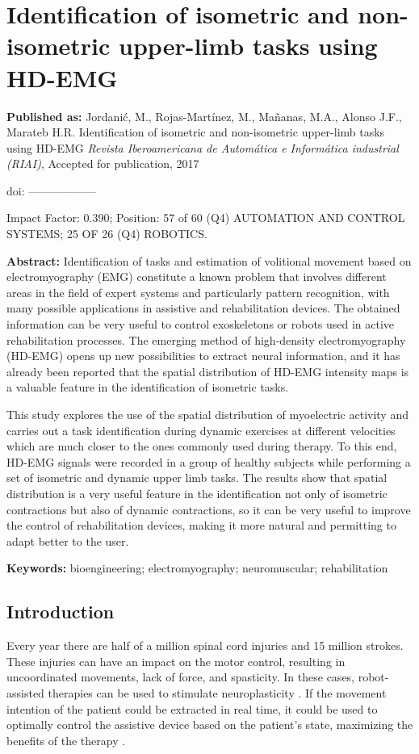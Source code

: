 \chapter[Isometric and non-isometric task identification]{Identification of isometric and non-isometric upper-limb tasks using HD-EMG}
\label{ch:p4}
\textbf{Published as:} 
Jordani\'c, M., Rojas-Mart\'inez, M., Ma\~nanas, M.A., Alonso J.F., Marateb H.R.
Identification of isometric and non-isometric upper-limb tasks using HD-EMG 
\textit{Revista Iberoamericana de Autom\'atica e Inform\'atica industrial (RIAI)}, Accepted for publication, 2017

doi: ------------------

Impact Factor: 0.390; Position: 57 of 60 (Q4) AUTOMATION AND CONTROL SYSTEMS; 25 OF 26 (Q4) ROBOTICS.


\textbf{Abstract:} Identification of tasks and estimation of volitional movement based on electromyography (EMG) constitute a known problem that involves different areas in the field of expert systems and particularly pattern recognition, with many possible applications in assistive and rehabilitation devices. The obtained information can be very useful to control exoskeletons or robots used in active rehabilitation processes. The emerging method of high-density electromyography (HD-EMG) opens up new possibilities to extract neural information, and it has already been reported that the spatial distribution of HD-EMG intensity maps is a valuable feature in the identification of isometric tasks.

This study explores the use of the spatial distribution of myoelectric activity and carries out a task identification during dynamic exercises at different velocities which are much closer to the ones commonly used during therapy. To this end, HD-EMG signals were recorded in a group of healthy subjects while performing a set of isometric and dynamic upper limb tasks. The results show that spatial distribution is a very useful feature in the identification not only of isometric contractions but also of dynamic contractions, so it can be very useful to improve the control of rehabilitation devices, making it more natural and permitting to adapt better to the user.

\textbf{Keywords:}  bioengineering; electromyography; neuromuscular; rehabilitation

\section{Introduction}
Every year there are half of a million spinal cord injuries and 15 million strokes. These injuries can have an impact on the motor control, resulting in uncoordinated movements, lack of force, and spasticity. In these cases, robot-assisted therapies can be used to stimulate neuroplasticity \citep{vanPepen2004}. If the movement intention of the patient could be extracted in real time, it could be used to optimally control the assistive device based on the patient's state, maximizing the benefits of the therapy \citep{Hogan2006}.

